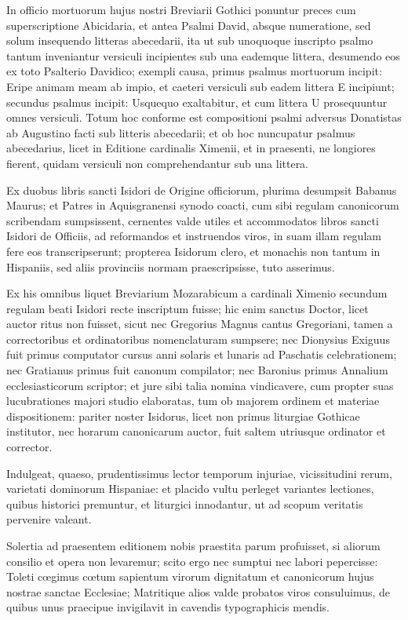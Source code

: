 \documentclass[letter,11pt]{book}
\begin{document}
In officio mortuorum hujus nostri Breviarii Gothici ponuntur preces cum superscriptione Abicidaria, et antea Psalmi David, absque numeratione, sed solum insequendo litteras abecedarii, ita ut sub unoquoque inscripto psalmo tantum inveniantur versiculi incipientes sub una eademque littera, desumendo eos ex toto Psalterio Davidico; exempli causa, primus psalmus mortuorum incipit: Eripe animam meam ab impio, et caeteri versiculi sub eadem littera E incipiunt; secundus psalmus incipit: Usquequo exaltabitur, et cum littera U prosequuntur omnes versiculi. Totum hoc conforme est compositioni psalmi adversus Donatistas ab Augustino facti sub litteris abecedarii; et ob hoc nuncupatur psalmus abecedarius, licet in Editione cardinalis Ximenii, et in praesenti, ne longiores fierent, quidam versiculi non comprehendantur sub una littera.

Ex duobus libris sancti Isidori de Origine officiorum, plurima desumpsit Babanus Maurus; et Patres in Aquisgranensi synodo coacti, cum sibi regulam canonicorum scribendam sumpsissent, cernentes valde utiles et accommodatos libros sancti Isidori de Officiis, ad reformandos et instruendos viros, in suam illam regulam fere eos transcripserunt; propterea Isidorum clero, et monachis non tantum in Hispaniis, sed aliis provinciis normam praescripsisse, tuto asserimus.

Ex his omnibus liquet Breviarium Mozarabicum a cardinali Ximenio secundum regulam beati Isidori recte inscriptum fuisse; hic enim sanctus Doctor, licet auctor ritus non fuisset, sicut nec Gregorius Magnus cantus Gregoriani, tamen a correctoribus et ordinatoribus nomenclaturam sumpsere; nec Dionysius Exiguus fuit primus computator cursus anni solaris et lunaris ad Paschatis celebrationem; nec Gratianus primus fuit canonum compilator; nec Baronius primus Annalium ecclesiasticorum scriptor; et jure sibi talia nomina vindicavere, cum propter suas lucubrationes majori studio elaboratas, tum ob majorem ordinem et materiae dispositionem: pariter noster Isidorus, licet non primus liturgiae Gothicae institutor, nec horarum canonicarum auctor, fuit saltem utriusque ordinator et corrector.

Indulgeat, quaeso, prudentissimus lector temporum injuriae, vicissitudini rerum, varietati dominorum Hispaniae: et placido vultu perleget variantes lectiones, quibus historici premuntur, et liturgici innodantur, ut ad scopum veritatis pervenire valeant.

Solertia ad praesentem editionem nobis praestita parum profuisset, si aliorum consilio et opera non levaremur; scito ergo nec sumptui nec labori pepercisse: Toleti cœgimus cœtum sapientum virorum dignitatum et canonicorum hujus nostrae sanctae Ecclesiae; Matritique alios valde probatos viros consuluimus, de quibus unus praecipue invigilavit in cavendis typographicis mendis.
\end{document}
